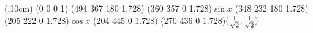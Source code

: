 % 
%
%
%




\magnification{}

\noindent\beginiteblock(\hsize,10cm)
\ITE(0 0 0 1)
\ITE(494 367 180 1.728)
\ITE(360 357 0 1.728)$\sin x$
\ITE(348 232 180 1.728)
\ITE(205 222 0 1.728)$\cos x$
\ITE(204 445 0 1.728)
\ITE(270 436 0 1.728)$({1\over\sqrt2},{1\over\sqrt2})$
\enditeblock

\bye











